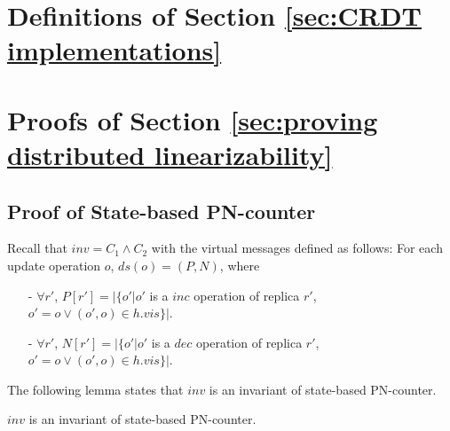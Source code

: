 \section{Definitions of Section \ref{sec:CRDT implementations}}
\label{sec:appendix definitions of section CRDT implementations}








\section{Proofs of Section \ref{sec:proving distributed linearizability}}
\label{sec:appendix proofs of section proving distributed linearizability}









\subsection{Proof of State-based PN-counter}
\label{subsec:appendix proof of state-based PN-counter}

Recall that $\mathit{inv} = C_1 \wedge C_2$ with the virtual messages defined as follows: For each update operation $o$, $\mathit{ds}(o) = (P,N)$, where

\begin{itemize}
\setlength{\itemsep}{0.5pt}
\item[-] $\forall r'$, $P[r'] = \vert \{ o' \vert o'$ is a $\mathit{inc}$ operation of replica $r'$, $o' = o \vee (o',o) \in h.\mathit{vis} \} \vert$.

\item[-] $\forall r'$, $N[r'] = \vert \{ o' \vert o'$ is a $\mathit{dec}$ operation of replica $r'$, $o' = o \vee (o',o) \in h.\mathit{vis} \} \vert$.
\end{itemize}

The following lemma states that $\mathit{inv}$ is an invariant of state-based PN-counter.

\begin{lemma}
\label{lemma:inv is an invariant of state-based CRDT for state-based PN-counter}
$\mathit{inv}$ is an invariant of state-based PN-counter.
\end{lemma}

